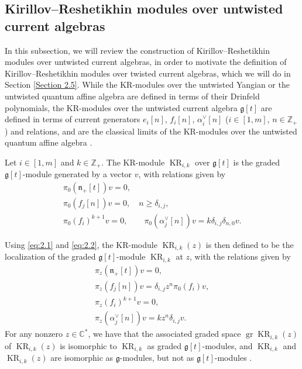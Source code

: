 \documentclass[10pt,a4paper]{amsart}
\numberwithin{equation}{section}
\DeclareMathOperator{\gr}{gr}
\DeclareMathOperator{\KR}{KR}
\begin{document}
\subsection{Kirillov--Reshetikhin modules over untwisted current algebras}\label{Section 2.3}

In this subsection, we will review the construction of Kirillov--Reshetikhin modules over untwisted current algebras, in order to motivate the definition of Kirillov--Reshetikhin modules over twisted current algebras, which we will do in Section \ref{Section 2.5}. While the KR-modules over the untwisted Yangian or the untwisted quantum affine algebra are defined in terms of their Drinfeld polynomials, the KR-modules over the untwisted current algebra $\mathfrak{g}[t]$ are defined in terms of current generators $e_i[n]$, $f_i[n]$, $\alpha_i^{\vee}[n]$ ($i\in[1,m]$, $n\in\mathbb{Z}_+$) and relations, and are the classical limits of the KR-modules over the untwisted quantum affine algebra \cite{CM06, Kedem11}.

\begin{Definition}[{\cite[Definition 2.1]{CM06}}]\label{2.1}
Let $i\in[1,m]$ and $k\in\mathbb{Z}_+$. The KR-module $\KR_{i,k}$ over $\mathfrak{g}[t]$ is the graded $\mathfrak{g}[t]$-module generated by a vector $v$, with relations given by
\begin{gather}
\pi_0(\mathfrak{n}_+[t])v=0,\nonumber\\
\pi_0(f_j[n])v=0,\quad n\geq\delta_{i,j},\nonumber\\
\pi_0(f_i)^{k+1}v=0,\qquad
\pi_0(\alpha_j^{\vee}[n])v=k\delta_{i,j}\delta_{n,0}v.\label{eq:2.2}
\end{gather}
\end{Definition}

Using \eqref{eq:2.1} and \eqref{eq:2.2}, the KR-module $\KR_{i,k}(z)$ is then defined to be the localization of the graded $\mathfrak{g}[t]$-module $\KR_{i,k}$ at $z$, with the relations given by
\begin{subequations}\label{eq:2.3}
\begin{gather}
\pi_z(\mathfrak{n}_+[t]) v=0,\\
\pi_z(f_j[n])v=\delta_{i,j}z^n\pi_0(f_i)v,\label{eq:2.3b}\\
\pi_z(f_i)^{k+1}v=0,\\
\pi_z(\alpha_j^{\vee}[n])v=kz^n\delta_{i,j}v.
\end{gather}
\end{subequations}
For any nonzero $z\in\mathbb{C}^*$, we have that the associated graded space $\gr \KR_{i,k}(z)$ of $\KR_{i,k}(z)$ is isomorphic to $\KR_{i,k}$ as graded $\mathfrak{g}[t]$-modules, and $\KR_{i,k}$ and $\KR_{i,k}(z)$ are isomorphic as $\mathfrak{g}$-modules, but not as $\mathfrak{g}[t]$-modules \cite{CM06}.
\end{document}
